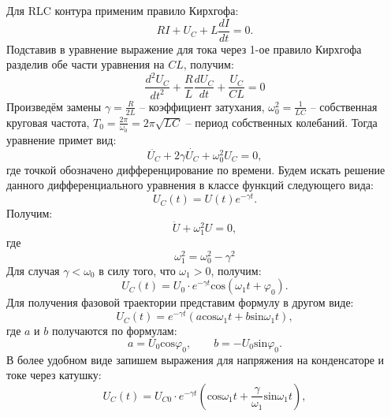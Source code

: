 \documentclass[a4paper, 12pt]{article}
\begin{document}
            \noindent Для RLC контура применим правило Кирхгофа:
            \begin{equation}
                RI + U_C + L\frac{dI}{dt} = 0.
            \end{equation}
            Подставив в уравнение выражение для тока через 1-ое правило Кирхгофа разделив обе части уравнения на $CL$, получим:
            \begin{equation}
                \frac{d^2U_C}{dt^2} + \frac{R}{L} \frac{dU_C}{dt} + \frac{U_C}{CL}=0
            \end{equation}
            Произведём замены $\gamma = \frac{R}{2L}$ -- коэффициент затухания, $\omega_0^2 = \frac{1}{LC}$ -- собственная круговая частота, $T_0 = \frac{2\pi}{\omega_0} = 2\pi \sqrt{LC}$ -- период собственных колебаний. Тогда уравнение примет вид:
            \begin{equation}
                \ddot{U_C} + 2 \gamma \dot{U_C} + \omega_0^2U_C = 0,
            \end{equation}
            где точкой обозначено дифференцирование по времени. Будем искать решение данного дифференциального уравнения в классе функций следующего вида:
            $$U_C(t) = U(t)e^{- \gamma t}.$$
            Получим:
            \begin{equation}
                \ddot{U} + \omega_1^2 U = 0,
            \end{equation}
            где
            \begin{equation}
                \omega_1^2 = \omega_0^2-\gamma^2
            \end{equation}
            Для случая $\gamma < \omega_0$ в силу того, что $\omega_1 > 0$, получим:
            \begin{equation}
                U_C(t) = U_0 \cdot e^{-\gamma t} \text{cos}(\omega_1 t + \varphi_0).
            \end{equation}
            Для получения фазовой траектории представим формулу в другом виде:
            \begin{equation}
                U_C(t) = e^{-\gamma t}(a \text{cos} \omega_1 t + b \text{sin} \omega_1 t),
            \end{equation}
            где $a$ и $b$ получаются по формулам:
            $$a = U_0 \text{cos} \varphi_0, \qquad b = - U_0 \text{sin} \varphi_0.$$
            В более удобном виде запишем выражения для напряжения на конденсаторе и токе через катушку:
            \begin{equation}
                U_C (t) = U_{C0} \cdot e^{-\gamma t} (\text{cos} \omega_1 t + \frac{\gamma}{\omega_1} \text{sin} \omega_1 t),
            \end{equation}
\end{document}

